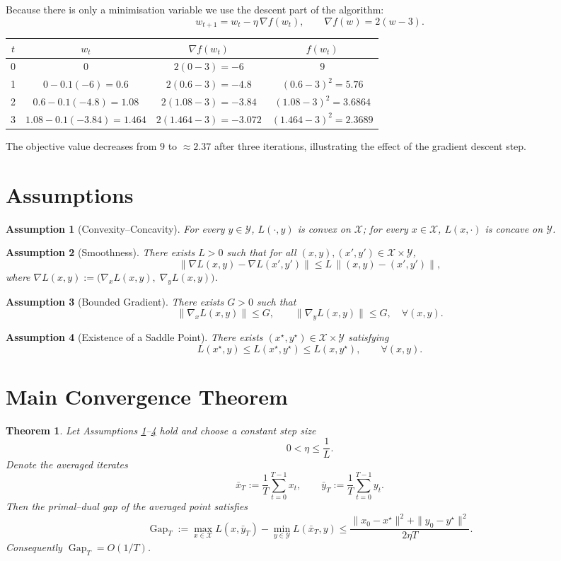 \documentclass{article}
\newtheorem{theorem}{Theorem}
\newtheorem{assumption}{Assumption}
\newcommand{\gap}{\operatorname{Gap}}
\begin{document}
Because there is only a minimisation variable we use the descent part of the algorithm:
\[
w_{t+1}=w_t-\eta\,\nabla f(w_t),\qquad \nabla f(w)=2(w-3).
\]

\begin{center}
\begin{tabular}{c|c|c|c}
$t$ & $w_t$ & $\nabla f(w_t)$ & $f(w_t)$\\ \hline
0 & $0$ & $2(0-3)=-6$ & $9$\\
1 & $0-0.1(-6)=0.6$ & $2(0.6-3)=-4.8$ & $(0.6-3)^2=5.76$\\
2 & $0.6-0.1(-4.8)=1.08$ & $2(1.08-3)=-3.84$ & $(1.08-3)^2=3.6864$\\
3 & $1.08-0.1(-3.84)=1.464$ & $2(1.464-3)=-3.072$ & $(1.464-3)^2=2.3689$
\end{tabular}
\end{center}
The objective value decreases from $9$ to $\approx2.37$ after three iterations, illustrating the effect of the gradient descent step.

\newpage
\section*{Assumptions}
\begin{assumption}[Convexity--Concavity]\label{as:cc}
For every $y\in\mathcal Y$, $L(\cdot,y)$ is convex on $\mathcal X$;  
for every $x\in\mathcal X$, $L(x,\cdot)$ is concave on $\mathcal Y$.
\end{assumption}
\begin{assumption}[Smoothness]\label{as:smooth}
There exists $L>0$ such that for all $(x,y),(x',y')\in\mathcal X\times\mathcal Y$,
\[
\big\|\nabla L(x,y)-\nabla L(x',y')\big\|\le L\,
\big\|(x,y)-(x',y')\big\|,
\]
where $\nabla L(x,y):=\big(\nabla_x L(x,y),\;\nabla_y L(x,y)\big)$.
\end{assumption}
\begin{assumption}[Bounded Gradient]\label{as:bound}
There exists $G>0$ such that 
\[
\|\nabla_x L(x,y)\|\le G,\qquad \|\nabla_y L(x,y)\|\le G,\quad\forall (x,y).
\]
\end{assumption}
\begin{assumption}[Existence of a Saddle Point]\label{as:saddle}
There exists $(x^\star,y^\star)\in\mathcal X\times\mathcal Y$ satisfying
\[
L(x^\star,y)\le L(x^\star,y^\star)\le L(x,y^\star),\qquad\forall (x,y).
\]
\end{assumption}

\section*{Main Convergence Theorem}
\begin{theorem}\label{thm:convergence}
Let Assumptions \ref{as:cc}–\ref{as:saddle} hold and choose a constant step size  
\[
0<\eta\le\frac{1}{L}.
\]
Denote the averaged iterates
\[
\bar x_T:=\frac{1}{T}\sum_{t=0}^{T-1}x_t,\qquad 
\bar y_T:=\frac{1}{T}\sum_{t=0}^{T-1}y_t.
\]
Then the primal–dual gap of the averaged point satisfies
\[
\gap_T:=\max_{x\in\mathcal X}L(x,\bar y_T)-\min_{y\in\mathcal Y}L(\bar x_T,y)
\le \frac{\|x_0-x^\star\|^2+\|y_0-y^\star\|^2}{2\eta T}.
\]
Consequently $\gap_T=O(1/T)$.
\end{theorem}
\end{document}
